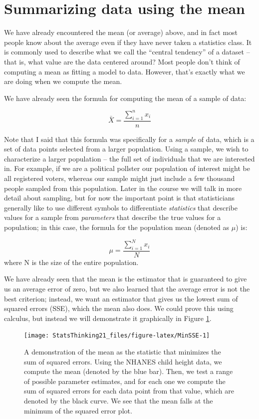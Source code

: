 \documentclass[12pt,]{book}
\theoremstyle{definition}
\theoremstyle{definition}
\theoremstyle{definition}
\theoremstyle{remark}
\begin{document}
\hypertarget{summarizing-data-using-the-mean}{%
\section{Summarizing data using the mean}\label{summarizing-data-using-the-mean}}

We have already encountered the mean (or average) above, and in fact most people know about the average even if they have never taken a statistics class. It is commonly used to describe what we call the ``central tendency'' of a dataset -- that is, what value are the data centered around? Most people don't think of computing a mean as fitting a model to data. However, that's exactly what we are doing when we compute the mean.

We have already seen the formula for computing the mean of a sample of data:

\[
\bar{X} = \frac{\sum_{i=1}^{n}x_i}{n}
\]

Note that I said that this formula was specifically for a \emph{sample} of data, which is a set of data points selected from a larger population. Using a sample, we wish to characterize a larger population -- the full set of individuals that we are interested in. For example, if we are a political pollster our population of interest might be all registered voters, whereas our sample might just include a few thousand people sampled from this population. Later in the course we will talk in more detail about sampling, but for now the important point is that statisticians generally like to use different symbols to differentiate \emph{statistics} that describe values for a sample from \emph{parameters} that describe the true values for a population; in this case, the formula for the population mean (denoted as \(\mu\)) is:

\[
\mu = \frac{\sum_{i=1}^{N}x_i}{N}
\]
where N is the size of the entire population.

We have already seen that the mean is the estimator that is guaranteed to give us an average error of zero, but we also learned that the average error is not the best criterion; instead, we want an estimator that gives us the lowest sum of squared errors (SSE), which the mean also does. We could prove this using calculus, but instead we will demonstrate it graphically in Figure \ref{fig:MinSSE}.

\begin{figure}
\texttt{[image: StatsThinking21\_files/figure-latex/MinSSE-1]} \caption{A demonstration of the mean as the statistic that minimizes the sum of squared errors.  Using the NHANES child height data, we compute the mean (denoted by the blue bar). Then, we test a range of possible parameter estimates, and for each one we compute the sum of squared errors for each data point from that value, which are denoted by the black curve.  We see that the mean falls at the minimum of the squared error plot.}\label{fig:MinSSE}
\end{figure}
\end{document}
